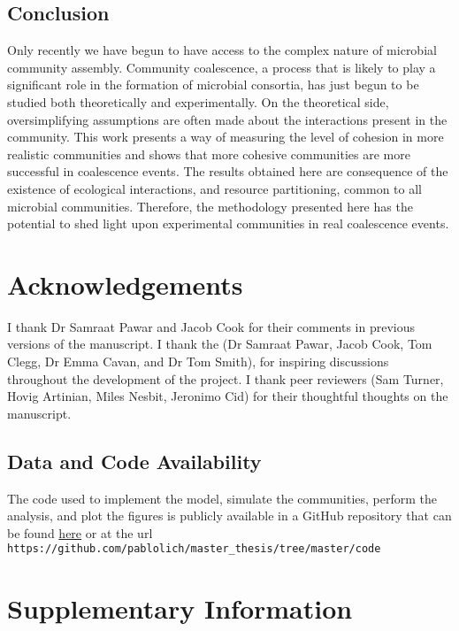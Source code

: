 \documentclass[titlepage,11pt]{article}
\begin{document}
\begin{linenumbers}
			\subsection{Conclusion}
				\hspace{15pt}Only recently we have begun to have access to the complex nature of microbial community assembly. Community coalescence, a process that is likely to play a significant role in the formation of microbial consortia, has just begun to be studied both theoretically and experimentally. On the theoretical side, oversimplifying assumptions are often made about the interactions present in the community. This work presents a way of measuring the level of cohesion in more realistic communities and shows that more cohesive communities are more successful in coalescence events. The results obtained here are consequence of the existence of ecological interactions, and resource partitioning, common to all microbial communities. Therefore, the methodology presented here has the potential to shed light upon experimental communities in real coalescence events.
	\section{Acknowledgements}
		 \hspace{15pt}I thank Dr Samraat Pawar and Jacob Cook for their comments in previous versions of the manuscript. I thank the  (Dr Samraat Pawar, Jacob Cook, Tom Clegg, Dr Emma Cavan, and Dr Tom Smith), for inspiring discussions throughout the development of the project. I thank peer reviewers (Sam Turner, Hovig Artinian, Miles Nesbit, Jeronimo Cid) for their thoughtful thoughts on the manuscript.
		
	\subsection*{Data and Code Availability}
		\hspace{15pt}The code used to implement the model, simulate the communities, perform the analysis, and plot the figures is publicly available in a GitHub repository that can be found \href{https://github.com/pablolich/master_thesis/tree/master/code}{here} or at the url \verb|https://github.com/pablolich/master_thesis/tree/master/code|
\end{linenumbers}
\clearpage


\newpage
{}
\section{Supplementary Information}
\end{document}
